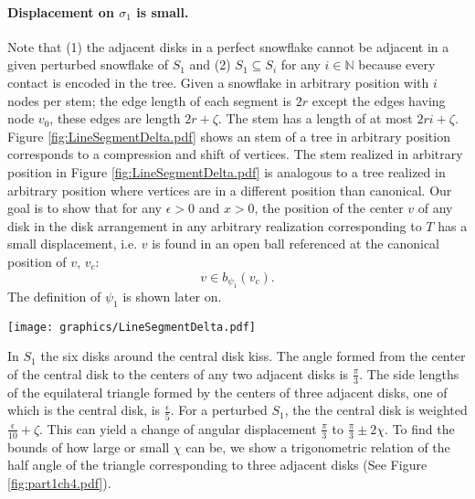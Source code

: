 \documentclass[10pt]{CSUNthesis}
\theoremstyle{plain}%
\theoremstyle{definition}
\theoremstyle{remark}
\newcommand{\bbN}{{\mathbb{N}}}
\begin{document}
\paragraph{Displacement on $\sigma_1$ is small.}
Note that (1) the adjacent disks in a perfect snowflake cannot be adjacent in a given perturbed snowflake of $S_1$ and (2) $S_1 \subseteq S_i$ for any $i \in \bbN$ because every contact is encoded in the tree.  
Given a snowflake in arbitrary position with $i$ nodes per stem; the edge length of each segment is $2r$ except the edges having node $v_0$, these edges are length $2r+ \zeta$.  
The stem has a length of at most $2ri+\zeta$.
Figure \ref{fig:LineSegmentDelta.pdf} shows an stem of a tree in arbitrary position corresponds to a compression and shift of vertices.  
The stem realized in arbitrary position in Figure \ref{fig:LineSegmentDelta.pdf} is analogous to a tree realized in arbitrary position where vertices are in a different position than canonical.  
Our goal is to show that for any $\epsilon >0$ and $x >0$, the position of the center $v$ of any disk in the disk arrangement in any arbitrary realization corresponding to $T$ has a small displacement, i.e. $v$ is found in an open ball referenced at the canonical position of $v$, $v_c$: $$v \in b_{\psi_1}(v_c).$$ 
The definition of $\psi_1$ is shown later on.

\begin{minipage}{\linewidth}
\begin{center}
\texttt{[image: graphics/LineSegmentDelta.pdf]}
\label{fig:LineSegmentDelta.pdf}
\end{center}
\end{minipage}
 
In $S_1$ the six disks around the central disk kiss.  
The angle formed from the center of the central disk to the centers of any two adjacent disks is $\frac{\pi}{3}$.  
The side lengths of the equilateral triangle formed by the centers of three adjacent disks, one of which is the central disk, is $\frac{\epsilon}{5}$.  
For a perturbed $S_1$, the the central disk is weighted $\frac{\epsilon}{10} + \zeta$.  
This can yield a change of angular displacement $\frac{\pi}{3}$ to $\frac{\pi}{3} \pm 2\chi$.  
To find the bounds of how large or small $\chi$ can be, we show a trigonometric relation of the half angle of the triangle corresponding to three adjacent disks (See Figure \ref{fig:part1ch4.pdf}).
\end{document}
